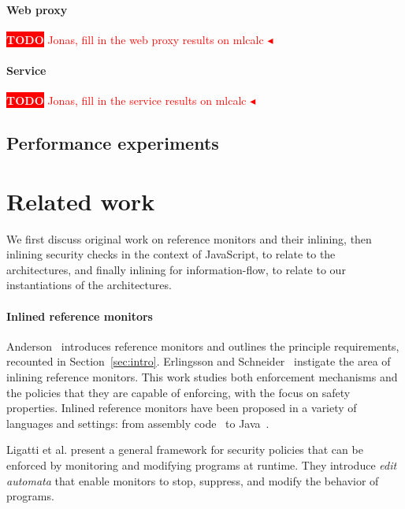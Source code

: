 \documentclass{llncs}
\newcommand{\todo}[1]{\colorbox{red}{\textcolor{white}{\sffamily\bfseries\scriptsize TODO}} \textcolor{red}{#1} \textcolor{red}{$\blacktriangleleft$}}
\begin{document}
\paragraph{Web proxy}

\todo{Jonas, fill in the web proxy results on mlcalc}


\paragraph{Service}

\todo{Jonas, fill in the service results on mlcalc}


\subsection{Performance experiments}

\section{Related work}
\label{sec:related}
We first discuss original work on reference monitors and their
inlining, then
inlining security checks in the context of
JavaScript, to relate to the architectures, 
and finally inlining for information-flow, to relate to our instantiations
of the architectures.

\paragraph{Inlined reference monitors}
Anderson~\cite{Anderson:72} introduces reference monitors and
outlines the principle requirements, recounted in Section~\ref{sec:intro}.
%
Erlingsson and Schneider~\cite{DBLP:conf/nspw/ErlingssonS99,Erlingsson:PhD04} instigate
the area of inlining reference monitors. 
This work studies both enforcement mechanisms and the policies
that they are capable of enforcing, with the focus on safety properties.
Inlined reference monitors
have been proposed in a variety of languages and settings: from
assembly code~\cite{DBLP:conf/nspw/ErlingssonS99} to Java~\cite{DBLP:conf/ecoop/DamJLP09,DBLP:journals/jcs/DamJLP10,DBLP:conf/ccs/DamGL12}.

Ligatti et al. \cite{Ligatti05editautomata:} present a 
general framework for security policies that can
be enforced by monitoring and modifying programs at runtime. 
They introduce \emph{edit automata} that enable
monitors to stop, suppress, and modify the behavior of programs. 
\end{document}

